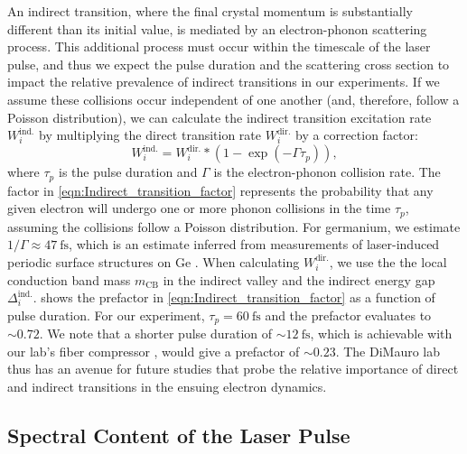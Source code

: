 An indirect transition, where the final crystal momentum is substantially different than its initial value, is mediated by an electron-phonon scattering process. This additional process must occur within the timescale of the laser pulse, and thus we expect the pulse duration and the scattering cross section to impact the relative prevalence of indirect transitions in our experiments. If we assume these collisions occur independent of one another (and, therefore, follow a Poisson distribution), we can calculate the indirect transition excitation rate $W_i^{\textrm{ind.}}$ by multiplying the direct transition rate $W_i^{\textrm{dir.}}$ by a correction factor:
\begin{equation}
W_i^{\textrm{ind.}} = W_i^{\textrm{dir.}} * (1 - \exp(-\Gamma \tau_p)),
\label{eqn:Indirect_transition_factor}
\end{equation}
where $\tau_p$ is the pulse duration and $\Gamma$ is the electron-phonon collision rate. The factor in \cref{eqn:Indirect_transition_factor} represents the probability that any given electron will undergo one or more phonon collisions in the time $\tau_p$, assuming the collisions follow a Poisson distribution. For germanium, we estimate $1/\Gamma \approx 47 \ \textrm{fs}$, which is an estimate inferred from measurements of laser-induced periodic surface structures on Ge \cite{austinSemiconductorSurfaceModification2017}. When calculating $W_i^{\textrm{dir.}}$, we use the the local conduction band mass $m_{\textrm{CB}}$ in the indirect valley and the indirect energy gap $\Delta_i^{\textrm{ind.}}$.  shows the prefactor in \cref{eqn:Indirect_transition_factor} as a function of pulse duration. For our experiment, $\tau_p = 60 \ \textrm{fs}$ and the prefactor evaluates to $\sim 0.72$. We note that a shorter pulse duration of $\sim 12 \ \textrm{fs}$, which is achievable with our lab's fiber compressor \cite{zhangAtomicMolecularDynamics2015}, would give a prefactor of $\sim 0.23$. The DiMauro lab thus has an avenue for future studies that probe the relative importance of direct and indirect transitions in the ensuing electron dynamics.

\subsection{Spectral Content of the Laser Pulse}
\label{sec:bandwidth_of_pulse}

